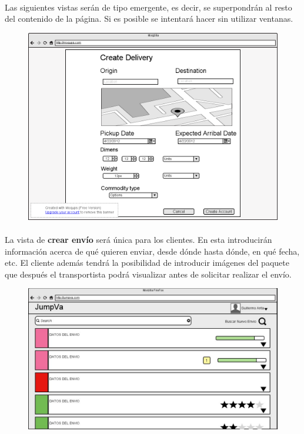 \documentclass[10pt, a4paper,spanish]{article}
\begin{document}
			\paragraph{}
			Las siguientes vistas serán de tipo emergente, es decir, se superpondrán al resto del contenido de la página. Si es posible se intentará hacer sin utilizar ventanas.


			\begin{figure}[H]
				\centering
				\begin{minipage}[b]{0.7\textwidth}
					\includegraphics[width=\textwidth]{res/CrearEnvio.png}
				\end{minipage}
			\end{figure}

			\paragraph{}
			La vista de \textbf{crear envío} será única para los clientes. En esta introducirán información acerca de qué quieren enviar, desde dónde hasta dónde, en qué fecha, etc. El cliente además tendrá la posibilidad de introducir imágenes del paquete que después el transportista podrá visualizar antes de solicitar realizar el envío.

			\begin{figure}[H]
				\centering
				\begin{minipage}[b]{0.7\textwidth}
					\includegraphics[width=\textwidth]{res/PaginaPrincipalTransportista.png}
				\end{minipage}
			\end{figure}
\end{document}
